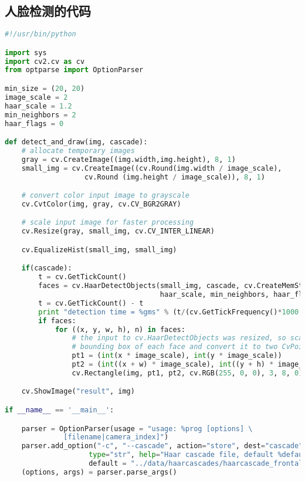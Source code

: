 \documentclass[openany]{ctexbook}
\begin{document}
\subsection{人脸检测的代码}
{\setmainfont{Courier New Bold}                          %
\begin{lstlisting}[language=python]
#!/usr/bin/python

import sys
import cv2.cv as cv
from optparse import OptionParser

min_size = (20, 20)
image_scale = 2
haar_scale = 1.2
min_neighbors = 2
haar_flags = 0

def detect_and_draw(img, cascade):
    # allocate temporary images
    gray = cv.CreateImage((img.width,img.height), 8, 1)
    small_img = cv.CreateImage((cv.Round(img.width / image_scale),
                   cv.Round (img.height / image_scale)), 8, 1)

    # convert color input image to grayscale
    cv.CvtColor(img, gray, cv.CV_BGR2GRAY)

    # scale input image for faster processing
    cv.Resize(gray, small_img, cv.CV_INTER_LINEAR)

    cv.EqualizeHist(small_img, small_img)

    if(cascade):
        t = cv.GetTickCount()
        faces = cv.HaarDetectObjects(small_img, cascade, cv.CreateMemStorage(0),
                                     haar_scale, min_neighbors, haar_flags, min_size)
        t = cv.GetTickCount() - t
        print "detection time = %gms" % (t/(cv.GetTickFrequency()*1000.))
        if faces:
            for ((x, y, w, h), n) in faces:
                # the input to cv.HaarDetectObjects was resized, so scale the
                # bounding box of each face and convert it to two CvPoints
                pt1 = (int(x * image_scale), int(y * image_scale))
                pt2 = (int((x + w) * image_scale), int((y + h) * image_scale))
                cv.Rectangle(img, pt1, pt2, cv.RGB(255, 0, 0), 3, 8, 0)

    cv.ShowImage("result", img)

if __name__ == '__main__':

    parser = OptionParser(usage = "usage: %prog [options] \
              [filename|camera_index]")
    parser.add_option("-c", "--cascade", action="store", dest="cascade",
                    type="str", help="Haar cascade file, default %default",
                    default = "../data/haarcascades/haarcascade_frontalface_alt.xml")
    (options, args) = parser.parse_args()


\end{lstlisting}}
\end{document}
